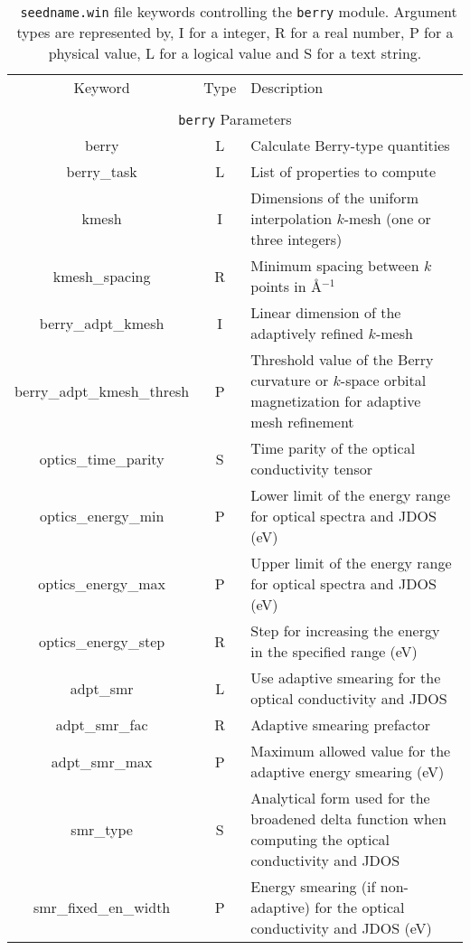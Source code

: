 \begin{table}[hH!]
\begin{center}
\begin{tabular}{|c|c|p{6cm}|}
  \hline
  Keyword & Type & Description \\
  &      &             \\
  \hline\hline
  \multicolumn{3}{|c|}{{\tt berry} Parameters} \\
  \hline
  {\sc berry}  & L & Calculate Berry-type quantities \\
  {\sc berry\_task}& L  & List of properties to compute \\
  {\sc [berry\_]kmesh} & I & Dimensions of the uniform interpolation $k$-mesh 
  (one or three integers)\\ 
  {\sc [berry\_]kmesh\_spacing}& R & Minimum spacing between $k$ points in 
  \AA$^{-1}$\\
  {\sc berry\_adpt\_kmesh} & I & Linear dimension of the adaptively refined 
  $k$-mesh\\ 
  {\sc berry\_adpt\_kmesh\_thresh} & P & Threshold value of the Berry 
  curvature or $k$-space orbital magnetization for adaptive mesh refinement\\ 
  {\sc optics\_time\_parity}& S & Time parity of the optical conductivity tensor\\ 
  {\sc optics\_energy\_min} & P & Lower limit of the energy range for
  optical spectra and JDOS (eV) \\
  {\sc optics\_energy\_max}& P & Upper limit of the energy range for
  optical spectra and JDOS (eV) \\
  {\sc optics\_energy\_step}& R &  Step for increasing the energy in the 
  specified range (eV)\\
  {\sc [optics\_]adpt\_smr} & L & Use adaptive smearing for the 
  optical conductivity and JDOS \\
  {\sc [optics\_]adpt\_smr\_fac} & R & Adaptive smearing prefactor \\
  {\sc[optics\_]adpt\_smr\_max} & P & Maximum allowed value for the 
  adaptive energy smearing (eV) \\
  {\sc [optics\_]smr\_type} & S & Analytical form used for the broadened delta function
  when computing the optical conductivity and JDOS\\  
  {\sc [optics\_]smr\_fixed\_en\_width} & P  & Energy smearing (if non-adaptive)
  for the optical conductivity and JDOS (eV) \\
  \hline
\end{tabular}
\caption[Parameter file keywords controlling the Berry module.]  {{\tt
    seedname.win} file keywords controlling the {\tt berry}
  module. Argument types are represented by, I for a integer, R for a
  real number, P for a physical value, L for a logical value and S for
  a text string.}
\label{parameter_keywords_berry}
\end{center}
\end{table}



